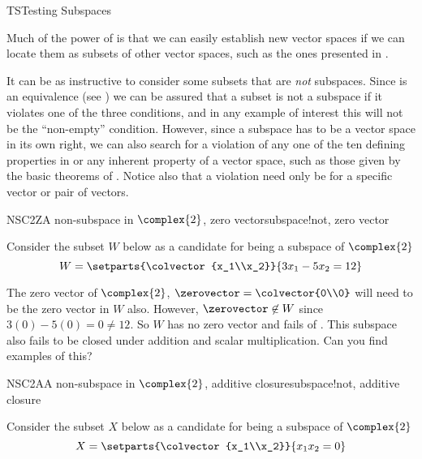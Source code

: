 \begin{subsect}{TS}{Testing Subspaces}
%
\begin{para}Much of the power of  is that we can easily establish new vector spaces if we can locate them as subsets of other vector spaces, such as the ones presented in .\end{para}
%
\begin{para}It can be as instructive to consider some subsets that are {\em not} subspaces.  Since  is an equivalence (see ) we can be assured that a subset is not a subspace if it violates one of the three conditions, and in any example of interest this will not be the ``non-empty'' condition.  However, since a subspace has to be a vector space in its own right, we can also search for a violation of any one of the ten defining properties in  or any inherent property of a vector space, such as those given by the basic theorems of .  Notice also that a violation need only be for a specific vector or pair of vectors.\end{para}
%
\begin{example}{NSC2Z}{A non-subspace in $\complex{2}$, zero vector}{subspace!not, zero vector}
\begin{para}Consider the subset $W$ below as a candidate for being a subspace of $\complex{2}$
%
\begin{equation*}
W=\setparts{\colvector{x_1\\x_2}}{3x_1-5x_2=12}
\end{equation*}
\end{para}
%
\begin{para}The zero vector of $\complex{2}$, $\zerovector=\colvector{0\\0}$ will need to be the zero vector in $W$ also.  However, $\zerovector\not\in W$ since $3(0)-5(0)=0\neq 12$.  So $W$ has no zero vector and fails  of .  This subspace also fails to be closed under addition and scalar multiplication.  Can you find examples of this?\end{para}
%
\end{example}
%
\begin{example}{NSC2A}{A non-subspace in $\complex{2}$, additive closure}{subspace!not, additive closure}
\begin{para}Consider the subset $X$ below as a candidate for being a subspace of $\complex{2}$
%
\begin{equation*}
X=\setparts{\colvector{x_1\\x_2}}{x_1x_2=0}

\end{equation*}
\end{para}
\end{example}
\end{subsect}
